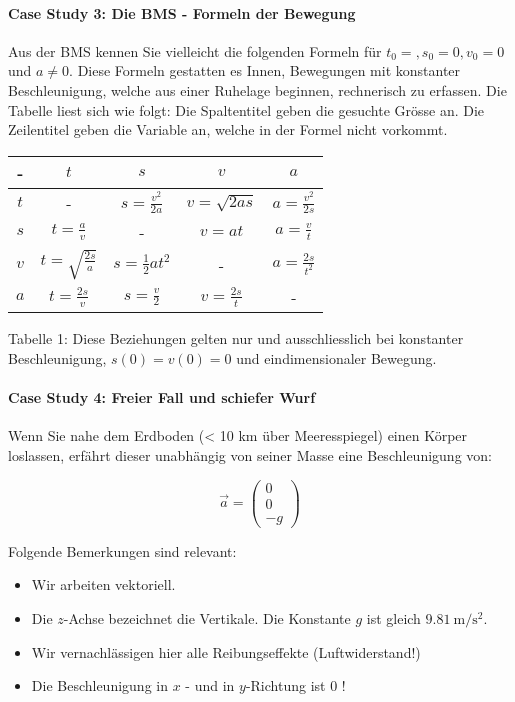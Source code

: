 \paragraph*{Case Study 3: Die BMS - Formeln der Bewegung}
Aus der BMS kennen Sie vielleicht die folgenden Formeln für $t_{0}=, s_{0}=0, v_{0}=0$ und $a \neq 0$. Diese Formeln gestatten es Innen, Bewegungen mit konstanter Beschleunigung, welche aus einer Ruhelage beginnen, rechnerisch zu erfassen. Die Tabelle liest sich wie folgt: Die Spaltentitel geben die gesuchte Grösse an. Die Zeilentitel geben die Variable an, welche in der Formel nicht vorkommt.

\renewcommand{\arraystretch}{1.8}
\begin{center}
\begin{tabular}{c|c|c|c|c}
- & $t$ & $s$ & $v$ & $a$  \\
\hline
$t$ & - & $s=\frac{v^{2}}{2 a}$ & $v=\sqrt{2 a s}$ & $a=\frac{v^{2}}{2 s}$ \\
\hline
$s$ & $t=\frac{a}{v}$ & - & $v=a t$ & $a=\frac{v}{t}$  \\
\hline
$v$ & $t=\sqrt{\frac{2 s}{a}}$ & $s=\frac{1}{2} a t^{2}$ & - & $a=\frac{2 s}{t^{2}}$  \\
\hline
$a$ & $t=\frac{2 s}{v}$ & $s=\frac{v}{2}$ & $v=\frac{2s}{t}$ & - \\
\hline
\end{tabular}
\end{center}
\renewcommand{\arraystretch}{1}

Tabelle 1: Diese Beziehungen gelten nur und ausschliesslich bei konstanter Beschleunigung, $s(0)=v(0)=0$ und eindimensionaler Bewegung.

\paragraph*{Case Study 4: Freier Fall und schiefer Wurf}
Wenn Sie nahe dem Erdboden (< 10 km über Meeresspiegel) einen Körper loslassen, erfährt dieser unabhängig von seiner Masse eine Beschleunigung von:

$$
\vec{a}=\left(\begin{array}{c}
0 \\
0 \\
-g
\end{array}\right)
$$

Folgende Bemerkungen sind relevant:

\begin{itemize}
  \item Wir arbeiten vektoriell.

  \item Die $z$-Achse bezeichnet die Vertikale. Die Konstante $g$ ist gleich $9.81 \mathrm{~m} / \mathrm{s}^{2}$.

  \item Wir vernachlässigen hier alle Reibungseffekte (Luftwiderstand!)

  \item Die Beschleunigung in $x$ - und in $y$-Richtung ist 0 !

\end{itemize}

